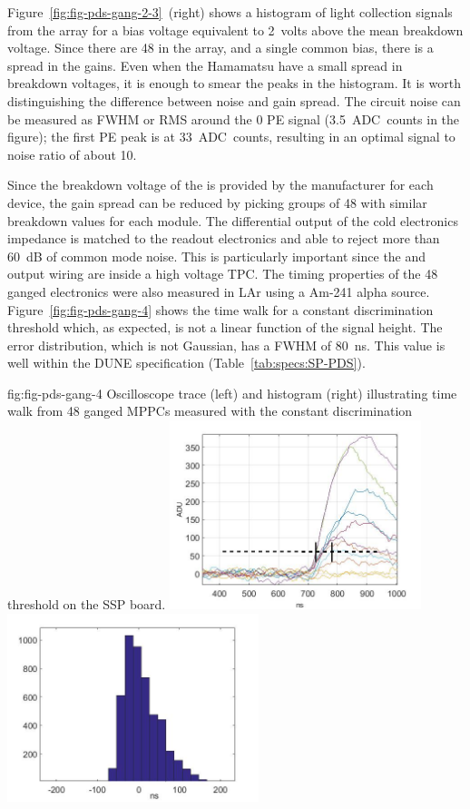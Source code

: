 Figure~\ref{fig:fig-pds-gang-2-3}~(right) shows a histogram of light collection signals from the array for a bias voltage equivalent to \SI{2}{volts} above the mean breakdown voltage. Since there are 48  in the array, and a single common bias, there is a spread in the gains. Even when the Hamamatsu  have a small spread in breakdown voltages, it is enough to smear the peaks in the histogram. It is worth distinguishing the difference between noise and gain spread. The circuit noise can be measured as FWHM or RMS around the 0 PE signal (\SI{3.5}{ADC counts} in the figure); the first PE peak is at \SI{33}{ADC counts}, resulting in an optimal signal to noise ratio of about 10.

Since the breakdown voltage of the  is provided by the manufacturer for each device, the gain spread can be reduced by picking groups of 48  with similar breakdown values for each module. The differential output of the cold electronics impedance is matched to the readout electronics and able to reject more than \SI{60}{dB} of common mode noise. This is particularly important since the  and output wiring are inside a high voltage TPC. The timing properties of the 48 ganged electronics were also measured in LAr using a Am-241 alpha source. 
Figure~\ref{fig:fig-pds-gang-4} shows the time walk for a constant discrimination threshold which, as expected, is not a linear function of the signal height. The error distribution, which is not Gaussian, has a FWHM of \SI{80}{ns}. This value is well within the DUNE specification (Table~\ref{tab:specs:SP-PDS}).

\begin{dunefigure}
 {fig:fig-pds-gang-4}
 {Oscilloscope trace (left) and histogram (right) illustrating time walk from 48 ganged MPPCs measured with the constant discrimination threshold on the SSP board.}
\includegraphics[height=5.5cm]{graphics/pds-gang-time-walk.jpg}
\includegraphics[height=5.5cm]{graphics/pds-gang-time-walk-hist.jpg}
\end{dunefigure}


